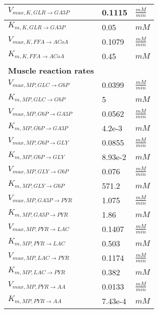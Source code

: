 \begin{supertabular}{lll}
$V_{max, K,GLR \xrightarrow[]{} GA3P}$ & 0.1115 & $\frac{mM}{min}$       \\ \hline
$K_{m, K,GLR \xrightarrow[]{} GA3P}$ & 0.05 & $mM$   \\ \hline

$V_{max, K,FFA \xrightarrow[]{} ACoA}$ & 0.1079 & $\frac{mM}{min}$       \\ \hline
$K_{m, K,FFA \xrightarrow[]{} ACoA}$ & 0.45 & $mM$   \\ \hline

\textbf{Muscle reaction rates} \\ 
$V_{max, MP,GLC \xrightarrow[]{} G6P}$ & 0.0399 & $\frac{mM}{min}$       \\ \hline
$K_{m, MP,GLC \xrightarrow[]{} G6P}$ & 5 & $mM$   \\ \hline

$V_{max, MP,G6P \xrightarrow[]{} GA3P}$ & 0.0562 & $\frac{mM}{min}$       \\ \hline
$K_{m, MP,G6P \xrightarrow[]{} GA3P}$ & 4.2e-3 & $mM$   \\ \hline

$V_{max, MP,G6P \xrightarrow[]{} GLY}$ & 0.0855 & $\frac{mM}{min}$       \\ \hline
$K_{m, MP,G6P \xrightarrow[]{} GLY}$ & 8.93e-2 & $mM$   \\ \hline

$V_{max, MP,GLY \xrightarrow[]{} G6P}$ & 0.076 & $\frac{mM}{min}$       \\ \hline
$K_{m, MP,GLY \xrightarrow[]{} G6P}$ & 571.2 & $mM$   \\ \hline

$V_{max, MP,GA3P \xrightarrow[]{} PYR}$ & 1.075 & $\frac{mM}{min}$       \\ \hline
$K_{m, MP,GA3P \xrightarrow[]{} PYR}$ & 1.86 & $mM$   \\ \hline

$V_{max, MP,PYR \xrightarrow[]{} LAC}$ & 0.1407 & $\frac{mM}{min}$       \\ \hline
$K_{m, MP,PYR \xrightarrow[]{} LAC}$ & 0.503 & $mM$   \\ \hline

$V_{max, MP,LAC \xrightarrow[]{} PYR}$ & 0.1174 & $\frac{mM}{min}$       \\ \hline
$K_{m, MP,LAC \xrightarrow[]{} PYR}$ & 0.382 & $mM$   \\ \hline

$V_{max, MP,PYR \xrightarrow[]{} AA}$ & 0.0133 & $\frac{mM}{min}$       \\ \hline
$K_{m, MP,PYR \xrightarrow[]{} AA}$ & 7.43e-4 & $mM$   \\ \hline


\end{supertabular}
